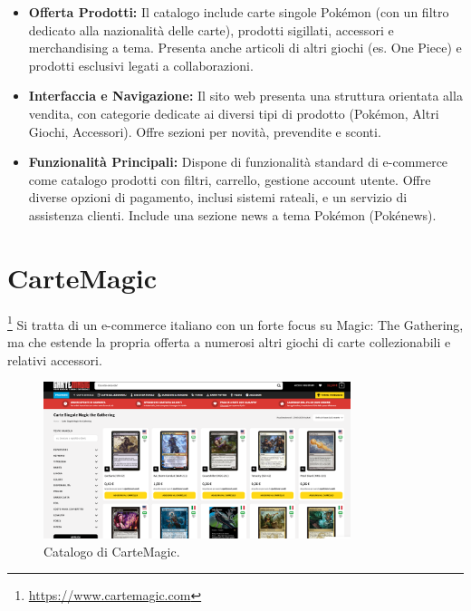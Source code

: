 \documentclass[14pt]{extreport}
\begin{document}
\begin{itemize}
    \item \textbf{Offerta Prodotti:} Il catalogo include carte singole Pokémon (con un filtro dedicato alla nazionalità delle carte), prodotti sigillati, accessori e merchandising a tema. Presenta anche articoli di altri giochi (es. One Piece) e prodotti esclusivi legati a collaborazioni.
    \item \textbf{Interfaccia e Navigazione:} Il sito web presenta una struttura orientata alla vendita, con categorie dedicate ai diversi tipi di prodotto (Pokémon, Altri Giochi, Accessori). Offre sezioni per novità, prevendite e sconti.
    \item \textbf{Funzionalità Principali:} Dispone di funzionalità standard di e-commerce come catalogo prodotti con filtri, carrello, gestione account utente. Offre diverse opzioni di pagamento, inclusi sistemi rateali, e un servizio di assistenza clienti. Include una sezione news a tema Pokémon (Pokénews).
\end{itemize}

\section{CarteMagic}\footnote{\url{https://www.cartemagic.com}}
Si tratta di un e-commerce italiano con un forte focus su Magic: The Gathering, ma che estende la propria offerta a numerosi altri giochi di carte collezionabili e relativi accessori.

\begin{figure}[h!]
    \centering
    \includegraphics[width=0.8\textwidth]{carte-magic.png}
    \caption{Catalogo di CarteMagic.}
\end{figure}
\end{document}
